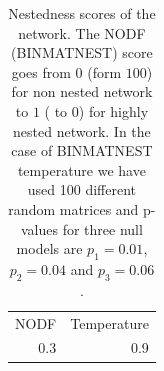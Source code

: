 \documentclass[10pt,a4paper]{article}
\begin{document}
\begin{table}[h!]
\centering
\caption{\label{tab:tab2}Nestedness scores of the network. The NODF (BINMATNEST) score goes from $0$ (form $100$) for non nested network to $1$ ( to $0$) for highly nested network. In the case of BINMATNEST temperature we have used 100 different random matrices and p-values for three null models are $p_{1} = 0.01$, $p_{2} = 0.04$ and $p_{3} = 0.06$.}
\begin{tabular}{|r|r|}
\cline{1-2}
NODF & Temperature\\
\cline{1-2}
0.3&0.9\\
\cline{1-2}
\end{tabular}
\end{table}
\clearpage
\printbibliography
	
\end{document}
